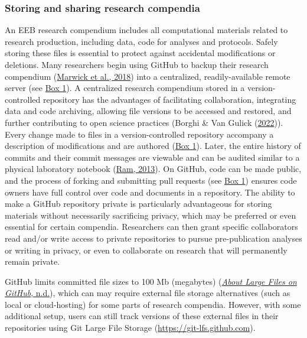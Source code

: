 \hypertarget{storing-and-sharing-research-compendia}{%
\subsubsection{Storing and sharing research compendia}\label{storing-and-sharing-research-compendia}}

An EEB research compendium includes all computational materials related to research production, including data, code for analyses and protocols.
Safely storing these files is essential to protect against accidental modifications or deletions.
Many researchers begin using GitHub to backup their research compendium (\protect\hyperlink{ref-MwwMapRG}{Marwick et al., 2018}) into a centralized, readily-available remote server (see \protect\hyperlink{definitions}{Box 1}).
A centralized research compendium stored in a version-controlled repository has the advantages of facilitating collaboration, integrating data and code archiving, allowing file versions to be accessed and restored, and further contributing to open science practices (Borghi \& Van Gulick (\protect\hyperlink{ref-gLby7jt1}{2022})).
Every change made to files in a version-controlled repository accompany a description of modifications and are authored (\protect\hyperlink{definitions}{Box 1}).
Later, the entire history of commits and their commit messages are viewable and can be audited similar to a physical laboratory notebook (\protect\hyperlink{ref-4ny1onB0}{Ram, 2013}).
On GitHub, code can be made public, and the process of forking and submitting pull requests (see \protect\hyperlink{definitions}{Box 1}) ensures code owners have full control over code and documents in a repository.
The ability to make a GitHub repository private is particularly advantageous for storing materials without necessarily sacrificing privacy, which may be preferred or even essential for certain compendia.
Researchers can then grant specific collaborators read and/or write access to private repositories to pursue pre-publication analyses or writing in privacy, or even to collaborate on research that will permanently remain private.

GitHub limits committed file sizes to 100 Mb (megabytes) (\protect\hyperlink{ref-1Co6ZZjF1}{\emph{About Large Files on GitHub}, n.d.}), which can may require external file storage alternatives (such as local or cloud-hosting) for some parts of research compendia.
However, with some additional setup, users can still track versions of these external files in their repositories using Git Large File Storage (\url{https://git-lfs.github.com}).

